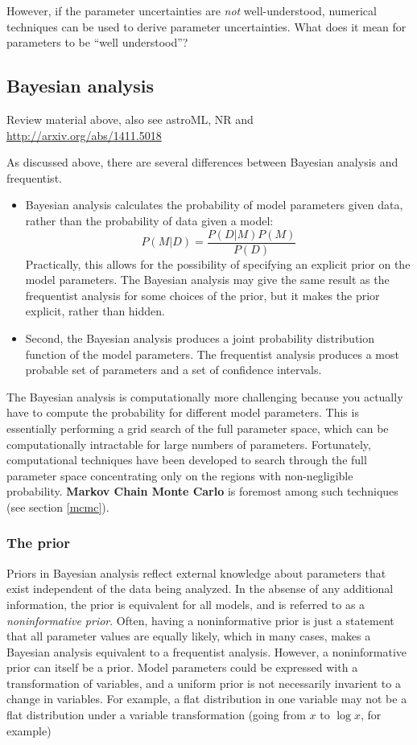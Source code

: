 \documentclass{article}
\newcommand{\mynotes}[1]{%
    \textcolor{myGreen}{\fontfamily{phv}\selectfont #1}
    }
\begin{document}
However, if the parameter uncertainties are \emph{not} well-understood,
numerical techniques can be used to derive parameter uncertainties.
\mynotes{What does it mean for parameters to be ``well understood''?}

\subsection{Bayesian analysis}
Review material above, also see astroML, NR and
\url{http://arxiv.org/abs/1411.5018}

As discussed above, there are several differences between Bayesian analysis
and frequentist.
\begin{itemize}
    \item Bayesian analysis calculates the probability of model parameters
        given data, rather than the probability of data given a model:
        \[
            {P(M|D)} = \frac{P(D|M)P(M)}{P(D)}
            \]
        Practically, this allows for the possibility of specifying an explicit
        prior on the model parameters. The Bayesian analysis may give the same
        result as the frequentist analysis for some choices of the prior, but
        it makes the prior explicit, rather than hidden.
    \item Second, the Bayesian analysis produces a joint probability
        distribution function of the model parameters. The frequentist analysis
        produces a most probable set of parameters and a set of confidence
        intervals.
\end{itemize}

The Bayesian analysis is computationally more challenging because you actually
have to compute the probability for different model parameters. This is
essentially performing a grid search of the full parameter space, which can be
computationally intractable for large numbers of parameters. Fortunately,
computational techniques have been developed to search through the full
parameter space concentrating only on the regions with non-negligible
probability. \textbf{Markov Chain Monte Carlo} is foremost among such
techniques (see section \ref{mcmc}).

\subsubsection{The prior}\label{prior}
Priors in Bayesian analysis reflect external knowledge about parameters that
exist independent of the data being analyzed.
In the absense of any additional information, the prior is equivalent for all
models, and is referred to as a \textit{noninformative prior}. Often, having a
noninformative prior is just a statement that all parameter values are equally
likely, which in many cases, makes a Bayesian analysis equivalent to a
frequentist analysis. However, a noninformative prior can itself be a prior.
Model parameters could be expressed with a transformation of variables, and a
uniform prior is not necessarily invarient to a change in variables. For
example, a flat distribution in one variable may not be a flat distribution
under a variable transformation (going from $x$ to $\log{x}$, for example)
\end{document}
